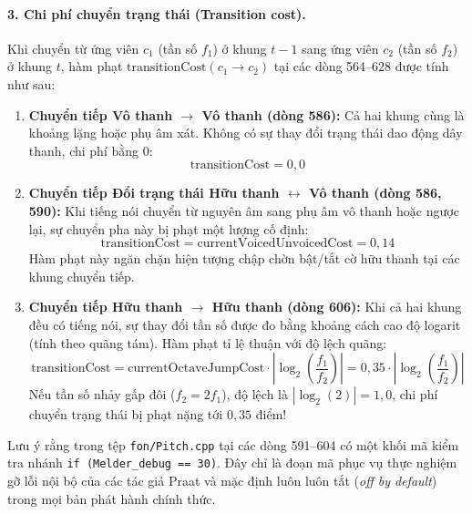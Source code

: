 \paragraph{3. Chi phí chuyển trạng thái (Transition cost).}
Khi chuyển từ ứng viên $c_1$ (tần số $f_1$) ở khung $t-1$ sang ứng viên $c_2$ (tần số $f_2$) ở khung $t$, hàm phạt $\text{transitionCost}(c_1 \to c_2)$ tại các dòng 564--628 được tính như sau:
\begin{enumerate}
    \item \textbf{Chuyển tiếp Vô thanh $\to$ Vô thanh (dòng 586):} Cả hai khung cùng là khoảng lặng hoặc phụ âm xát. Không có sự thay đổi trạng thái dao động dây thanh, chi phí bằng $0$:
    \begin{equation}
        \text{transitionCost} = 0{,}0
    \end{equation}
    \item \textbf{Chuyển tiếp Đổi trạng thái Hữu thanh $\leftrightarrow$ Vô thanh (dòng 586, 590):} Khi tiếng nói chuyển từ nguyên âm sang phụ âm vô thanh hoặc ngược lại, sự chuyển pha này bị phạt một lượng cố định:
    \begin{equation}
        \text{transitionCost} = \text{currentVoicedUnvoicedCost} = 0{,}14
    \end{equation}
    Hàm phạt này ngăn chặn hiện tượng chập chờn bật/tắt cờ hữu thanh tại các khung chuyển tiếp.
    \item \textbf{Chuyển tiếp Hữu thanh $\to$ Hữu thanh (dòng 606):} Khi cả hai khung đều có tiếng nói, sự thay đổi tần số được đo bằng khoảng cách cao độ logarit (tính theo quãng tám). Hàm phạt tỉ lệ thuận với độ lệch quãng:
    \begin{equation}
        \text{transitionCost} = \text{currentOctaveJumpCost} \cdot \left| \log_2\left(\frac{f_1}{f_2}\right) \right| = 0{,}35 \cdot \left| \log_2\left(\frac{f_1}{f_2}\right) \right|
    \end{equation}
    Nếu tần số nhảy gấp đôi ($f_2 = 2f_1$), độ lệch là $|\log_2(2)| = 1{,}0$, chi phí chuyển trạng thái bị phạt nặng tới $0{,}35$ điểm!
\end{enumerate}

Lưu ý rằng trong tệp \texttt{fon/Pitch.cpp} tại các dòng 591--604 có một khối mã kiểm tra nhánh \texttt{if (Melder\_debug == 30)}. Đây chỉ là đoạn mã phục vụ thực nghiệm gỡ lỗi nội bộ của các tác giả Praat và mặc định luôn luôn tắt (\emph{off by default}) trong mọi bản phát hành chính thức.

